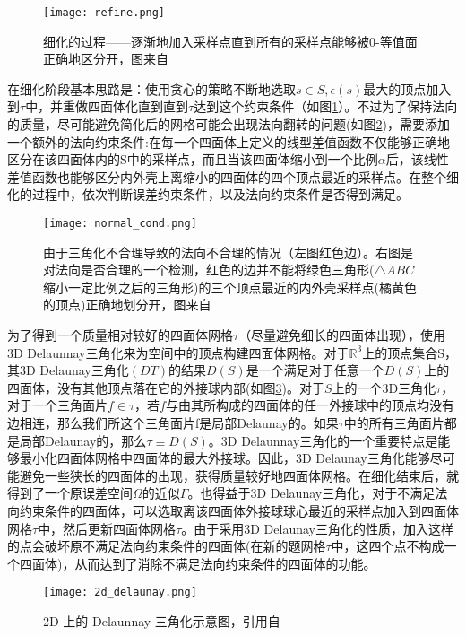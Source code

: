 \begin{figure}[htbp]
    \centering
    \texttt{[image: refine.png]}
    \caption{细化的过程——逐渐地加入采样点直到所有的采样点能够被0-等值面正确地区分开，图来自\cite{isotopic-appro}}
    \label{fig:refine}
\end{figure}

\par 在细化阶段基本思路是：使用贪心的策略不断地选取$s \in S,\epsilon(s)$最大的顶点加入到$\tau$中，并重做四面体化直到直到$\tau$达到这个约束条件（如图\ref{fig:refine}）。不过为了保持法向的质量，尽可能避免简化后的网格可能会出现法向翻转的问题(如图\ref{fig:normal-cond})，需要添加一个额外的法向约束条件:在每一个四面体上定义的线型差值函数不仅能够正确地区分在该四面体内的S中的采样点，而且当该四面体缩小到一个比例$\alpha$后，该线性差值函数也能够区分内外壳上离缩小的四面体的四个顶点最近的采样点。在整个细化的过程中，依次判断误差约束条件，以及法向约束条件是否得到满足。
\begin{figure}[htbp]
    \centering
    \texttt{[image: normal\_cond.png]}
    \caption{由于三角化不合理导致的法向不合理的情况（左图红色边）。右图是对法向是否合理的一个检测，红色的边并不能将绿色三角形($\triangle ABC$缩小一定比例之后的三角形)的三个顶点最近的内外壳采样点(橘黄色的顶点)正确地划分开，图来自\cite{isotopic-appro}}
    \label{fig:normal-cond}
\end{figure}
为了得到一个质量相对较好的四面体网格$\tau$（尽量避免细长的四面体出现），使用3D Delaunnay三角化来为空间中的顶点构建四面体网格。对于$\mathbb{R}^3$上的顶点集合S，其3D Delaunay三角化$(DT)$的结果$D(S)$是一个满足对于任意一个$D(S)$上的四面体，没有其他顶点落在它的外接球内部(如图\ref{fig:2d-delaunay})。对于$S$上的一个3D三角化$\tau$，对于一个三角面片$f \in \tau$，若$f$与由其所构成的四面体的任一外接球中的顶点均没有边相连，那么我们所这个三角面片f是局部Delaunay的。如果$\tau$中的所有三角面片都是局部Delaunay的，那么$\tau \equiv D(S)$。3D Delaunnay三角化的一个重要特点是能够最小化四面体网格中四面体的最大外接球。因此，3D Delaunay三角化能够尽可能避免一些狭长的四面体的出现，获得质量较好地四面体网格。在细化结束后，就得到了一个原误差空间$\Omega$的近似$\Gamma$。也得益于3D Delaunay三角化，对于不满足法向约束条件的四面体，可以选取离该四面体外接球球心最近的采样点加入到四面体网格$\tau$中，然后更新四面体网格$\tau$。由于采用3D Delaunay三角化的性质，加入这样的点会破坏原不满足法向约束条件的四面体(在新的题网格$\tau$中，这四个点不构成一个四面体)，从而达到了消除不满足法向约束条件的四面体的功能。
\begin{figure}[htbp]
    \centering
    \texttt{[image: 2d\_delaunay.png]}
    \caption{2D 上的 Delaunnay 三角化示意图，引用自\cite{wiki}}
    \label{fig:2d-delaunay}
\end{figure}

